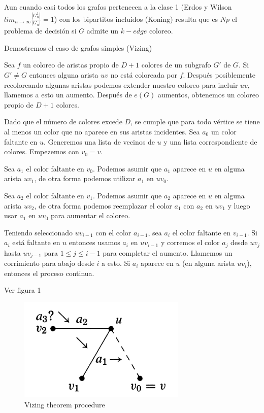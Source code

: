 \documentclass[a4paper]{article}
\begin{document}
 Aun cuando casi todos los grafos pertenecen a la clase 1 (Erdos y Wilson $lim_{n \rightarrow  \infty} \frac{|G_n^1|}{|G_n|} = 1$) con los bipartitos incluidos (Koning) resulta que es $Np$ el problema de decisi\'on si $G$ admite un $k-edge$ coloreo.

 Demostremos el caso de grafos simples (Vizing)

 Sea $f$ un coloreo de aristas propio de $D + 1$ colores de un subgrafo $G'$ de $G$. Si $G' \neq G $ entonces alguna arista $uv$ no est\'a coloreada por $f$. Despu\'es posiblemente recoloreando algunas aristas podemos extender nuestro coloreo para incluir $uv$, llamemos a esto un aumento. Despu\'es de $e(G)$ aumentos, obtenemos un coloreo propio de $D + 1$ colores. 
 
 Dado que el n\'umero de colores excede $D$, se cumple que para todo v\'ertice se tiene al menos un color que no aparece en sus aristas incidentes. Sea $a_0$ un color faltante en $u$. Generemos una lista de vecinos de $u$ y una lista correspondiente de colores. Empezemos con $v_0 = v$.
 
 Sea $a_1$ el color faltante en $v_0$. Podemos asumir que $a_1$ aparece en $u$ en alguna arista $uv_1$, de otra forma podemos utilizar $a_1$ en $uv_0$.
 
 Sea $a_2$ el color faltante en $v_1$. Podemos asumir que $a_2$ aparece en $u$ en alguna arista $uv_2$, de otra forma podemos reemplazar el color $a_1$ con $a_2$ en $uv_1$ y luego usar $a_1$ en $uv_0$ para aumentar el coloreo. 
 
 Teniendo seleccionado $uv_{i-1}$ con el color $a_{i-1}$, sea $a_i$ el color faltante en $v_{i-1}$. Si $a_i$ est\'a faltante en $u$ entonces usamos $a_i$ en $uv_{i-1}$ y corremos el color $a_j$ desde $uv_j$ hasta $uv_{j-1}$ para $1 \leq j \leq i-1$ para completar el aumento. Llamemos un corrimiento para abajo desde $i$ a esto. Si $a_i$ aparece en $u$ (en alguna arista $uv_i$), entonces el proceso continua.

 Ver figura 1
 
\begin{figure}
    \begin{center}
        \includegraphics[width=8cm]{image1.png}
        \caption{Vizing theorem procedure} 
    \end{center}
\end{figure}
\end{document}

